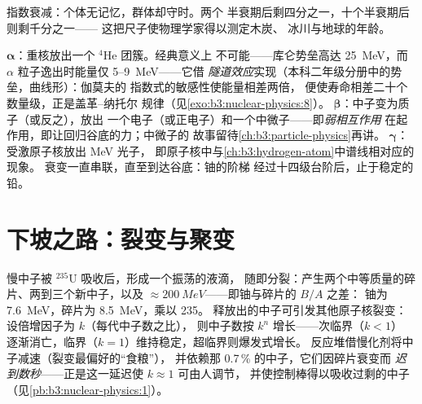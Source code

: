 \begin{omfigure}

{\small 指数衰减：个体无记忆，群体却守时。两个
半衰期后剩四分之一，十个半衰期后则剩千分之一——
这把尺子使物理学家得以测定木炭、
冰川与地球的年龄。}
\end{omfigure}

\begin{remark}[原子核的三条出路]\label{rem:b3:nuclear-physics:modes}
$\boldsymbol\alpha$：重核放出一个 $^4$He 团簇。经典意义上
不可能——库仑势垒高达 \qty{25}{MeV}，而
$\alpha$ 粒子逸出时能量仅 \qty{5}{}--\qty{9}{MeV}——它借
\emph{隧道效应}实现（本科二年级分册中的势垒，曲线形）：伽莫夫的
指数式的敏感性使能量相差两倍，
便使寿命相差二十个数量级，正是盖革–纳托尔
规律（见\cref{exo:b3:nuclear-physics:8}）。
$\boldsymbol\beta$：中子变为质子（或反之），放出
一个电子（或正电子）和一个中微子——即\emph{弱相互作用}
在起作用，即让回归谷底的力；中微子的
故事留待\cref{ch:b3:particle-physics}再讲。
$\boldsymbol\gamma$：受激原子核放出 \unit{MeV} 光子，
即原子核中与\cref{ch:b3:hydrogen-atom}中谱线相对应的现象。
衰变一直串联，直至到达谷底：铀的阶梯
经过十四级台阶后，止于稳定的铅。
\end{remark}

\section{下坡之路：裂变与聚变}

\begin{proposition}[裂变与链式反应]\label{prop:b3:nuclear-physics:fission}
慢中子被 $^{235}$U 吸收后，形成一个振荡的液滴，
随即分裂：产生两个中等质量的碎片、两到三个新中子，以及
$\approx\qty{200}{MeV}$——即铀与碎片的 $B/A$ 之差：
铀为 \qty{7.6}{MeV}，碎片为 \qty{8.5}{MeV}，乘以 235。
释放出的中子可引发其他原子核裂变：
设倍增因子为 $k$（每代中子数之比），
则中子数按 $k^n$ 增长——次临界（$k < 1$）
逐渐消亡，临界（$k = 1$）维持稳定，超临界则爆发式增长。
反应堆借慢化剂将中子减速（裂变最偏好的“食粮”），
并依赖那 0.7\,\% 的中子，它们因碎片衰变而
\emph{迟到数秒}——正是这一延迟使 $k \approx 1$ 可由人调节，
并使控制棒得以吸收过剩的中子
（见\cref{pb:b3:nuclear-physics:1}）。
\end{proposition}
\admitted

